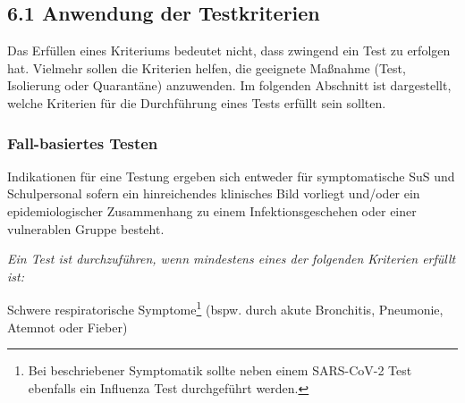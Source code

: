\documentclass{article}
\begin{document}
\subsection{6.1 Anwendung der Testkriterien }\label{H6515269}



Das Erfüllen eines Kriteriums bedeutet nicht, dass zwingend ein Test zu erfolgen hat. Vielmehr sollen die Kriterien helfen, die geeignete Maßnahme (Test, Isolierung oder Quarantäne) anzuwenden. Im folgenden Abschnitt ist dargestellt, welche Kriterien für die Durchführung eines Tests erfüllt sein sollten. 


\subsubsection{Fall-basiertes Testen }\label{H8802528}



Indikationen für eine Testung ergeben sich entweder für symptomatische SuS und Schulpersonal sofern ein hinreichendes klinisches Bild vorliegt und/oder ein epidemiologischer Zusammenhang zu einem Infektionsgeschehen oder einer vulnerablen Gruppe besteht. 


\emph{Ein Test ist durchzuführen, wenn mindestens eines der folgenden Kriterien erfüllt ist:}


Schwere respiratorische Symptome\footnote{Bei beschriebener Symptomatik sollte neben einem SARS-CoV-2 Test ebenfalls ein Influenza Test durchgeführt werden.} (bspw. durch akute Bronchitis, Pneumonie, Atemnot oder Fieber) 
\end{document}
